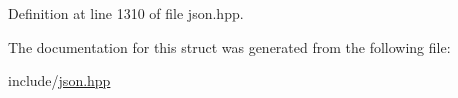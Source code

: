 Definition at line 1310 of file json.\+hpp.



The documentation for this struct was generated from the following file\+:\begin{DoxyCompactItemize}
\item 
include/\hyperlink{json_8hpp}{json.\+hpp}\end{DoxyCompactItemize}
